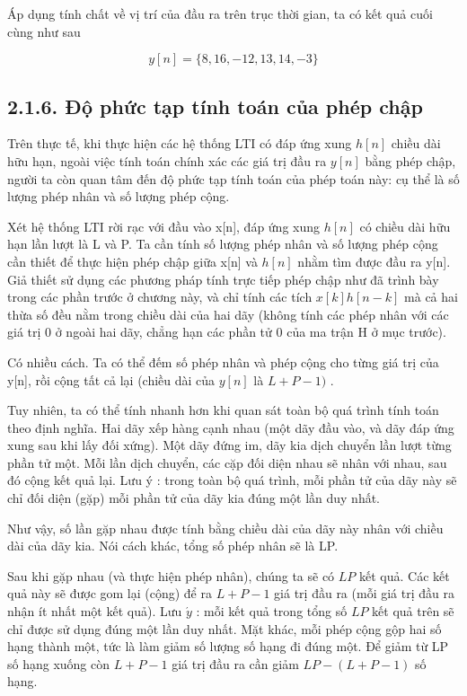 \documentclass[
  10
]{article}
\begin{document}
Áp dụng tính chất về vị trí của đầu ra trên trục thời gian, ta có kết
quả cuối cùng như sau

\[
y [ n ] = \{8, 1 6, - 1 2, 1 3, 1 4, - 3 \}
\]

\subsection{2.1.6. Độ phức tạp tính toán của phép
chập}\label{ux111ux1ed9-phux1ee9c-tux1ea1p-tuxednh-touxe1n-cux1ee7a-phuxe9p-chux1eadp}

Trên thực tế, khi thực hiện các hệ thống LTI có đáp ứng xung \(h [ n ]\)
chiều dài hữu hạn, ngoài việc tính toán chính xác các giá trị đầu ra
\(y [ n ]\) bằng phép chập, người ta còn quan tâm đến độ phức tạp tính
toán của phép toán này: cụ thể là số lượng phép nhân và số lượng phép
cộng.

Xét hệ thống LTI rời rạc với đầu vào x{[}n{]}, đáp ứng xung \(h [ n ]\)
có chiều dài hữu hạn lần lượt là L và P. Ta cần tính số lượng phép nhân
và số lượng phép cộng cần thiết để thực hiện phép chập giữa x{[}n{]} và
\(h [ n ]\) nhằm tìm được đầu ra y{[}n{]}. Giả thiết sử dụng các phương
pháp tính trực tiếp phép chập như đã trình bày trong các phần trước ở
chương này, và chỉ tính các tích \(x [ k ] h [ n - k ]\) mà cả hai thừa
số đều nằm trong chiều dài của hai dãy (không tính các phép nhân với các
giá trị 0 ở ngoài hai dãy, chẳng hạn các phần tử 0 của ma trận H ở mục
trước).

Có nhiều cách. Ta có thể đếm số phép nhân và phép cộng cho từng giá trị
của y{[}n{]}, rồi cộng tất cả lại (chiều dài của \(y [ n ]\) là
\(L + P - 1 )\) .

Tuy nhiên, ta có thể tính nhanh hơn khi quan sát toàn bộ quá trình tính
toán theo định nghĩa. Hai dãy xếp hàng cạnh nhau (một dãy đầu vào, và
dãy đáp ứng xung sau khi lấy đối xứng). Một dãy đứng im, dãy kia dịch
chuyển lần lượt từng phần tử một. Mỗi lần dịch chuyển, các cặp đối diện
nhau sẽ nhân với nhau, sau đó cộng kết quả lại. Lưu ý : trong toàn bộ
quá trình, mỗi phần tử của dãy này sẽ chỉ đối diện (gặp) mỗi phần tử của
dãy kia đúng một lần duy nhất.

Như vậy, số lần gặp nhau được tính bằng chiều dài của dãy này nhân với
chiều dài của dãy kia. Nói cách khác, tổng số phép nhân sẽ là LP.

Sau khi gặp nhau (và thực hiện phép nhân), chúng ta sẽ có \(L P\) kết
quả. Các kết quả này sẽ được gom lại (cộng) để ra \(L + P - 1\) giá trị
đầu ra (mỗi giá trị đầu ra nhận ít nhất một kết quả). Lưu
\(\acute { y }\) : mỗi kết quả trong tổng số \(L P\) kết quả trên sẽ chỉ
được sử dụng đúng một lần duy nhất. Mặt khác, mỗi phép cộng gộp hai số
hạng thành một, tức là làm giảm số lượng số hạng đi đúng một. Để giảm từ
LP số hạng xuống còn \(L + P - 1\) giá trị đầu ra cần giảm
\(L P - ( L + P - 1 )\) số hạng.
\end{document}
